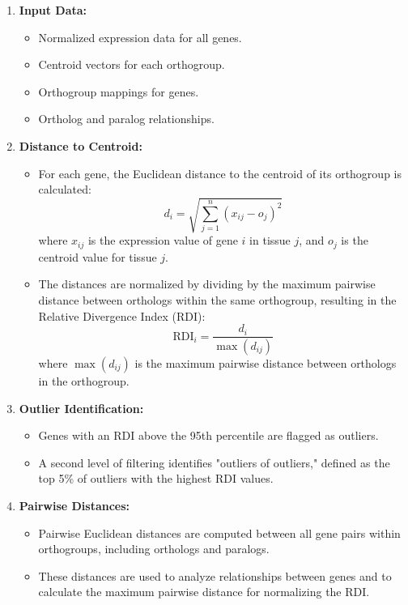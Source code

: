 \documentclass{article}
\begin{document}
\begin{enumerate}
    \item \textbf{Input Data:}
    \begin{itemize}
        \item Normalized expression data for all genes.
        \item Centroid vectors for each orthogroup.
        \item Orthogroup mappings for genes.
        \item Ortholog and paralog relationships.
    \end{itemize}

    \item \textbf{Distance to Centroid:}
    \begin{itemize}
        \item For each gene, the Euclidean distance to the centroid of its orthogroup is calculated:
        \[
        d_i = \sqrt{\sum_{j=1}^n (x_{ij} - o_j)^2}
        \]
        where \( x_{ij} \) is the expression value of gene \( i \) in tissue \( j \), and \( o_j \) is the centroid value for tissue \( j \).
        \item The distances are normalized by dividing by the maximum pairwise distance between orthologs within the same orthogroup, resulting in the Relative Divergence Index (RDI):
        \[
        \text{RDI}_i = \frac{d_i}{\max(d_{ij})}
        \]
        where \( \max(d_{ij}) \) is the maximum pairwise distance between orthologs in the orthogroup.
    \end{itemize}

    \item \textbf{Outlier Identification:}
    \begin{itemize}
        \item Genes with an RDI above the 95th percentile are flagged as outliers.
        \item A second level of filtering identifies "outliers of outliers," defined as the top 5\% of outliers with the highest RDI values.
    \end{itemize}

    \item \textbf{Pairwise Distances:}
    \begin{itemize}
        \item Pairwise Euclidean distances are computed between all gene pairs within orthogroups, including orthologs and paralogs.
        \item These distances are used to analyze relationships between genes and to calculate the maximum pairwise distance for normalizing the RDI.
    \end{itemize}


\end{enumerate}
\end{document}

